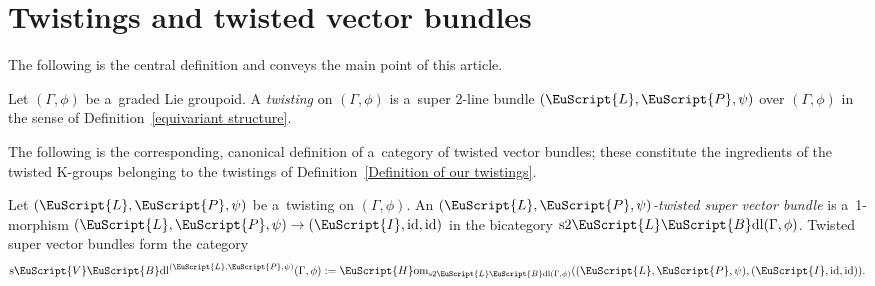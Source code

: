 \documentclass[pdftex]{sigma}
\numberwithin{equation}{section}
\def\mathscr#1{\EuScript{#1}}
\newcommand{\id}{\operatorname{id}}
\newcommand{\Hom}{\mathscr{H}\mathrm{om}}
\newcommand{\VectBdl}{\mathscr{V}\mathscr{B}\mathrm{dl}}
\newcommand{\LineBdl}{\mathscr{L}\mathscr{B}\mathrm{dl}}
\newcommand{\sVectBdl}{\mathrm{s}\VectBdl}
\newcommand{\stwoLineBdl}{\mathrm{s}2\LineBdl}
\begin{document}
\section{Twistings and twisted vector bundles}
\label{twistings}

The following is the central definition and conveys the main point of this article.

\begin{Definition} \label{Definition of our twistings}
Let $(\Gamma,\phi)$ be a~graded Lie groupoid. A \emph{twisting} on $(\Gamma,\phi)$ is a~super 2-line bundle $(\mathscr{L},\mathscr{P},\psi)$ over $(\Gamma,\phi)$ in the sense of Definition~\ref{equivariant structure}.
\end{Definition}

The following is the corresponding, canonical definition of a~category of twisted vector bundles; these constitute the ingredients of the twisted K-groups belonging to the twistings of Definition~\ref{Definition of our twistings}.

\begin{Definition}
\label{Definition of our twisted vector bundles}
Let $(\mathscr{L},\mathscr{P},\psi)$ be a~twisting on $(\Gamma,\phi)$. An \emph{$(\mathscr{L},\mathscr{P},\psi)$-twisted super vector bundle} is a~1-morphism $(\mathscr{L},\mathscr{P},\psi) \to (\mathscr{I},\id,\id)$ in the bicategory $\stwoLineBdl(\Gamma,\phi)$. Twisted super vector bundles form the category
\begin{equation*}
\sVectBdl^{(\mathscr{L},\mathscr{P},\psi)}(\Gamma,\phi) := \Hom_{\stwoLineBdl(\Gamma,\phi)}((\mathscr{L},\mathscr{P},\psi), (\mathscr{I},\id,\id)).
\end{equation*}
\end{Definition}
\end{document}
